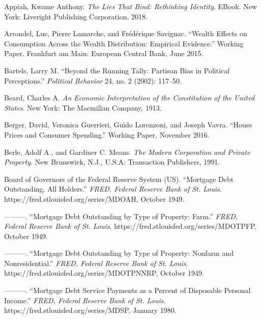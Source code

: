 \documentclass[12pt,oneside]{psthesis}
\begin{document}
\leavevmode\hypertarget{ref-appiah2018lies}{}%
Appiah, Kwame Anthony. \emph{The Lies That Bind: Rethinking Identity}. EBook. New York: Liveright Publishing Corporation, 2018.

\leavevmode\hypertarget{ref-arrondel2015wealth}{}%
Arrondel, Luc, Pierre Lamarche, and Frédérique Savignac. ``Wealth Effects on Consumption Across the Wealth Distribution: Empirical Evidence.'' Working Paper. Frankfurt am Main: European Central Bank, June 2015.

\leavevmode\hypertarget{ref-bartels2002running}{}%
Bartels, Larry M. ``Beyond the Running Tally: Partisan Bias in Political Perceptions.'' \emph{Political Behavior} 24, no. 2 (2002): 117--50.

\leavevmode\hypertarget{ref-beard1913economic}{}%
Beard, Charles A. \emph{An Economic Interpretation of the Constitution of the United States}. New York: The Macmillan Company, 1913.

\leavevmode\hypertarget{ref-berger2016house}{}%
Berger, David, Veronica Guerrieri, Guido Lorenzoni, and Joseph Vavra. ``House Prices and Consumer Spending.'' Working Paper, November 2016.

\leavevmode\hypertarget{ref-berle1991modern}{}%
Berle, Adolf A., and Gardiner C. Means. \emph{The Modern Corporation and Private Property}. New Brunswick, N.J., U.S.A: Transaction Publishers, 1991.

\leavevmode\hypertarget{ref-boardofgovernorsofthefederalreservesystemus1949mortgagec}{}%
Board of Governors of the Federal Reserve System (US). ``Mortgage Debt Outstanding, All Holders.'' \emph{FRED, Federal Reserve Bank of St. Louis}. https://fred.stlouisfed.org/series/MDOAH, October 1949.

\leavevmode\hypertarget{ref-boardofgovernorsofthefederalreservesystemus1949mortgagea}{}%
---------. ``Mortgage Debt Outstanding by Type of Property: Farm.'' \emph{FRED, Federal Reserve Bank of St. Louis}. https://fred.stlouisfed.org/series/MDOTPFP, October 1949.

\leavevmode\hypertarget{ref-boardofgovernorsofthefederalreservesystemus1949mortgageb}{}%
---------. ``Mortgage Debt Outstanding by Type of Property: Nonfarm and Nonresidential.'' \emph{FRED, Federal Reserve Bank of St. Louis}. https://fred.stlouisfed.org/series/MDOTPNNRP, October 1949.

\leavevmode\hypertarget{ref-boardofgovernorsofthefederalreservesystemus1980mortgage}{}%
---------. ``Mortgage Debt Service Payments as a Percent of Disposable Personal Income.'' \emph{FRED, Federal Reserve Bank of St. Louis}. https://fred.stlouisfed.org/series/MDSP, January 1980.
\end{document}
